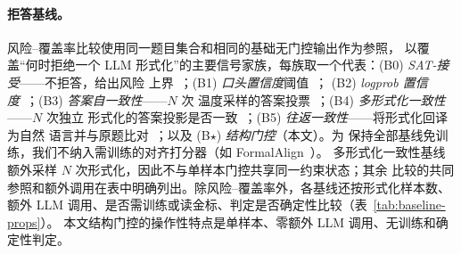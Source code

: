 \documentclass[letterpaper]{article}
\begin{document}
\paragraph{拒答基线。}风险--覆盖率比较使用同一题目集合和相同的基础无门控输出作为参照，
以覆盖“何时拒绝一个 LLM 形式化”的主要信号家族，每族取一个代表：(B0) \emph{SAT-接受}——不拒答，给出风险
上界~\cite{pan2023,ye2023}；(B1) \emph{口头置信度}阈值~\cite{xiong2024,zhang2024rtuning}；
(B2) \emph{logprob 置信度}~\cite{geifman2017,kamath2020}；(B3) \emph{答案自一致性}——$N$ 次
温度采样的答案投票~\cite{wang2023,manakul2023}；(B4) \emph{多形式化一致性}——$N$ 次独立
形式化的答案投影是否一致~\cite{raza2025}；(B5) \emph{往返一致性}——将形式化回译为自然
语言并与原题比对~\cite{ryu2025,zhou2024dtv}；以及 (B$\star$) \emph{结构门控}（本文）。为
保持全部基线免训练，我们不纳入需训练的对齐打分器（如 FormalAlign~\cite{lu2025}）。
多形式化一致性基线额外采样 $N$ 次形式化，因此不与单样本门控共享同一约束状态；其余
比较的共同参照和额外调用在表中明确列出。除风险--覆盖率外，各基线还按形式化样本数、
额外 LLM 调用、是否需训练或读金标、判定是否确定性比较（表~\ref{tab:baseline-props}）。
本文结构门控的操作性特点是单样本、零额外 LLM 调用、无训练和确定性判定。

\begin{table}[ht]
  \centering
  \caption{拒答信号的代价--性质对比（设计事实；风险--覆盖率见 \S\ref{sec:baseline-cmp}）。}
  \label{tab:baseline-props}
  \small
\end{table}
\end{document}
